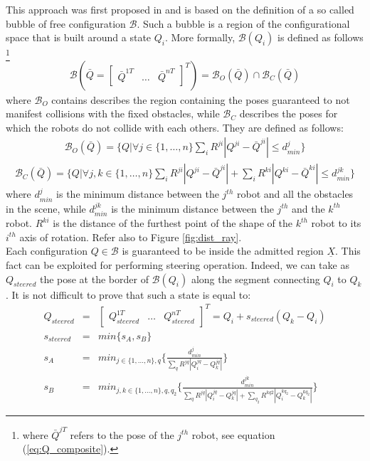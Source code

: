 This approach was first proposed in \cite{Bubble} and is based on the definition of a so called bubble of free configuration $\mathcal{B}$. Such a bubble is a region of the configurational space that is built around a state $Q_i$. More formally, $\mathcal{B}(Q_i)$ is defined as follows \footnote{where $\bar{Q}^{jT}$ refers to the pose of the $j^{th}$ robot, see equation (\ref{eq:Q_composite}). }
\begin{eqnarray}
\mathcal{B}(\bar{Q} = \begin{bmatrix} \bar{Q}^{1T} & \hdots & \bar{Q}^{nT} \end{bmatrix}^T) = \mathcal{B}_O(\bar{Q}) \cap \mathcal{B}_C(\bar{Q}) 
\end{eqnarray} 
where $\mathcal{B}_O$ contains describes the region containing the poses guaranteed to not manifest collisions with the fixed obstacles, while $\mathcal{B}_C$ describes the poses for which the robots do not collide with each others. They are defined as follows:
\begin{eqnarray}
\mathcal{B}_O(\bar{Q}) =  \bigg \lbrace Q  \bigg | \forall j \in \lbrace 1,\hdots,n \rbrace 
\sum_i R^{ji} | Q^{ji} - \bar{Q}^{ji} | \leq d^j_{min}
\bigg \rbrace 
\end{eqnarray}
\begin{eqnarray}
\mathcal{B}_C(\bar{Q}) =  \bigg \lbrace Q  \bigg | \forall j,k \in \lbrace 1,\hdots,n \rbrace 
\sum_i R^{ji} | Q^{ji} - \bar{Q}^{ji} | + \sum_i R^{ki} | Q^{ki} - \bar{Q}^{ki} | \leq d^{jk}_{min}
\bigg \rbrace 
\end{eqnarray}
where $d^j_{min}$ is the minimum distance between the $j^{th}$ robot and all the obstacles in the scene, while $d^{jk}_{min}$ is the minimum distance between the $j^{th}$ and the $k^{th}$ robot. $R^{ki}$ is the distance of the furthest point of the shape of the $k^{th}$ robot to its $i^{th}$ axis of rotation. Refer also to Figure \ref{fig:dist_ray}.
\\
Each configuration $Q \in \mathcal{B}$ is guaranteed to be inside the admitted region $\underline{X}$. This fact can be exploited for performing steering operation.
Indeed, we can take as $Q_{steered}$ the pose at the border of $\mathcal{B}(Q_i)$ along the segment connecting $Q_i$ to $Q_k$. It is not difficult to prove that such a state is equal to:
\begin{eqnarray}
Q_{steered} &=& \begin{bmatrix} Q_{steered}^{1T} & \hdots & Q_{steered}^{nT} \end{bmatrix}^T =  Q_i + s_{steered} (Q_k - Q_i) \nonumber\\
s_{steered} &=& min \bigg \lbrace s_A, s_B \bigg \rbrace  \nonumber\\
s_A &=& min_{j\in \lbrace 1,\hdots,n \rbrace, q} \bigg \lbrace 
\frac{d^j_{min}}{\sum _q R^{jq} | Q^{jq}_i - Q^{jq}_k |} 
\bigg \rbrace \nonumber\\
s_B &=& min_{j, k\in \lbrace 1,\hdots,n \rbrace, q,q_2} \bigg \lbrace 
\frac{d^{jk}_{min}}{\sum _q R^{jq} | Q^{jq}_i - Q^{jq}_k | + \sum _{q_2} R^{kq2} | Q^{kq_2}_i - Q^{kq_2}_k |}
\bigg \rbrace
\end{eqnarray}
